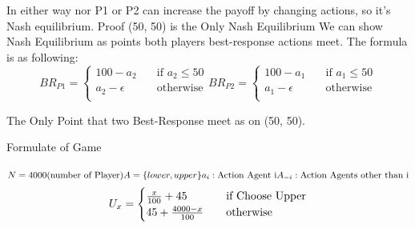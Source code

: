 \documentclass[
  course = {{IE579 Game Theory and Multi-Agent Reinforcement Learning}},
  assignment = 1,
  name = {{Mohammad Mahdi Rahimi}},
  studentnumber = {{20208244}},
  email = {{mahi@kaist.ac.kr}},
  firstexercise = 1
]{aga-homework}
\begin{document}
In either way nor P1 or P2 can increase the payoff by changing actions, so it's Nash equilibrium.
\newpage
\subexercise Proof (50, 50) is the Only Nash Equilibrium
We can show Nash Equilibrium as points both players best-response actions meet.
The formula is as following:
\[ BR_{P1} = 
     \begin{cases}
       100 - a_2 &\quad\text{if } a_2 \le 50\\
       a_2 - \epsilon &\quad\text{otherwise}\\ 
     \end{cases}
     BR_{P2} = 
     \begin{cases}
       100 - a_1 &\quad\text{if } a_1 \le 50\\
       a_1 - \epsilon &\quad\text{otherwise}\\ 
     \end{cases}
\]
\begin{center}
\end{center}
The Only Point that two Best-Response meet as on (50, 50).


\exercise
\subexercise Formulate of Game
\\\\
$
N = 4000 \text{(number of Player)}\\\\
A = \{lower, upper\}
a_i: \text{Action Agent i} \\\\
A_{-i}: \text{Action Agents other than i} \\\\
$
\[
U_{x} = 
     \begin{cases}
      {x \over 100} + 45 &\quad\text {if Choose Upper} \\
      45 + {4000 - x \over 100} &\quad\text{otherwise}\\ 
     \end{cases}
\]
\end{document}
